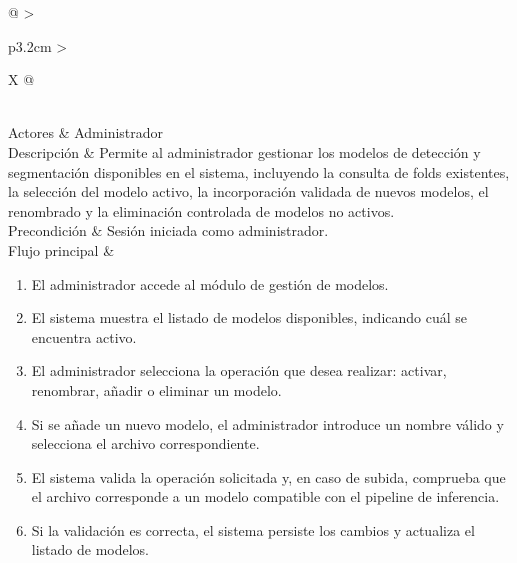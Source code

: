 \begin{table}[]
	\label{tab:cu11}
	\centering
	\footnotesize
	\renewcommand{\arraystretch}{1.3}
	\setlength{\tabcolsep}{4pt}
	\begin{tabularx}{\textwidth}{@{}
			>{\raggedright\arraybackslash}p{3.2cm}
			>{\raggedright\arraybackslash}X
			@{}}
		\toprule
		 \\
		\midrule
		Actores &
		Administrador \\
		
		Descripción &
		Permite al administrador gestionar los modelos de detección y segmentación disponibles en el sistema, incluyendo la consulta de folds existentes, la selección del modelo activo, la incorporación validada de nuevos modelos, el renombrado y la eliminación controlada de modelos no activos. \\
		
		Precondición &
		Sesión iniciada como administrador. \\
		
		Flujo principal &
		\begin{minipage}[t]{\linewidth}
			\vspace{-\baselineskip}
			\begin{enumerate}
				\renewcommand{\labelenumi}{\arabic{enumi})}
				\setlength{\itemsep}{0pt}
				\setlength{\parskip}{0pt}
				\setlength{\parsep}{0pt}
				\item El administrador accede al módulo de gestión de modelos.
				\item El sistema muestra el listado de modelos disponibles, indicando cuál se encuentra activo.
				\item El administrador selecciona la operación que desea realizar: activar, renombrar, añadir o eliminar un modelo.
				\item Si se añade un nuevo modelo, el administrador introduce un nombre válido y selecciona el archivo correspondiente.
				\item El sistema valida la operación solicitada y, en caso de subida, comprueba que el archivo corresponde a un modelo compatible con el pipeline de inferencia.
				\item Si la validación es correcta, el sistema persiste los cambios y actualiza el listado de modelos.
			\end{enumerate}
		\end{minipage} \\
		

\end{tabularx}
\end{table}
